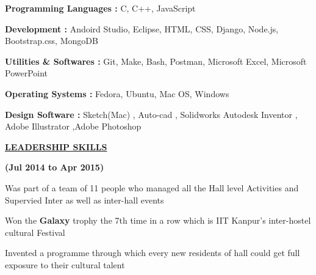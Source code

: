 \documentclass[letterpaper]{deedy-resume} %
\begin{document}
\begin{tightitemize}
\item \textbf{Programming Languages :  }C, C++, JavaScript
\item \textbf{Development \hspace{48pt}  : } Andoird Studio, Eclipse, HTML, CSS, Django, Node.js, Bootstrap.css, MongoDB
\item \textbf{Utilities \& Softwares \hspace{19pt}: } Git, Make, Bash, Postman, Microsoft Excel, Microsoft PowerPoint
\item \textbf{Operating Systems \hspace{27pt}: } Fedora, Ubuntu, Mac OS, Windows
\item \textbf{Design Software \hspace{35pt}      :} Sketch(Mac) , Auto-cad , Solidworks Autodesk Inventor , Adobe Illustrator ,Adobe Photoshop
\end{tightitemize}
\sectionspace
\sectionspace %


{\uppercase\uline{\textbf{\large{Leadership Skills}}\hfill}}

\microspace
{}
\hfill {\textbf{(Jul 2014 to Apr 2015)}}\\
\begin{tightitemize}
\item Was part of a team of 11 people who managed all the Hall level Activities and Supervied Inter as well as inter-hall events
\item Won the \textbf{Galaxy} trophy the 7th time in a row which is IIT Kanpur's inter-hostel cultural Festival
\item Invented a programme through which every new residents of hall could get full exposure to their cultural talent
\end{tightitemize}
\end{document}
